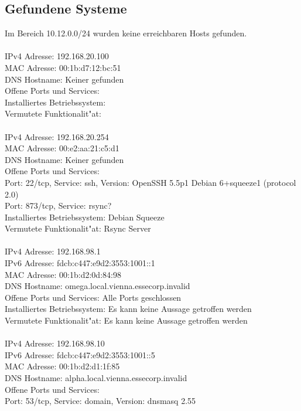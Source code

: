 \documentclass[12pt,a4paper,titlepage,oneside]{scrartcl}
\begin{document}
\subsection{Gefundene Systeme}
Im Bereich 10.12.0.0/24 wurden keine erreichbaren Hosts gefunden.\\
\\
IPv4 Adresse: 192.168.20.100\\
MAC Adresse: 00:1b:d7:12:bc:51\\
DNS Hostname: Keiner gefunden\\
Offene Ports und Services:\\
Installiertes Betriebssystem:\\
Vermutete Funktionalit"at:\\
\\
IPv4 Adresse: 192.168.20.254\\
MAC Adresse: 00:e2:aa:21:c5:d1\\
DNS Hostname: Keiner gefunden\\
Offene Ports und Services:\\
Port: 22/tcp, Service: ssh, Version: OpenSSH 5.5p1 Debian 6+squeeze1 (protocol 2.0)\\
Port: 873/tcp, Service: rsync?\\
Installiertes Betriebssystem: Debian Squeeze\\
Vermutete Funktionalit"at: Rsync Server\\
\\
IPv4 Adresse: 192.168.98.1\\
IPv6 Adresse: fdcb:c447:e9d2:3553:1001::1\\
MAC Adresse: 00:1b:d2:0d:84:98\\
DNS Hostname: omega.local.vienna.essecorp.invalid\\
Offene Ports und Services: Alle Ports geschlossen
\\
Installiertes Betriebssystem: Es kann keine Aussage getroffen werden\\
Vermutete Funktionalit"at: Es kann keine Aussage getroffen werden\\
\\
IPv4 Adresse: 192.168.98.10\\
IPv6 Adresse: fdcb:c447:e9d2:3553:1001::5\\
MAC Adresse: 00:1b:d2:d1:1f:85\\
DNS Hostname: alpha.local.vienna.essecorp.invalid\\
Offene Ports und Services:\\
Port: 53/tcp, Service: domain, Version: dnsmasq 2.55\\
\end{document}
